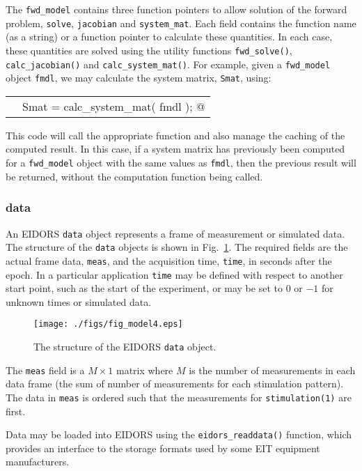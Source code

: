 \documentclass[12pt]{iopart}
\makeatletter
\newcommand{\CODEstart}{\medskip\begin{tabular}{ll}}
\newcommand{\CN}{\tt\scriptsize} %
\newcommand{\CC}{&\small\verb@}   % start code
\newcommand{\CODEend}{\end{tabular}\medskip}
\makeatother
\begin{document}
The {\tt fwd\_model} contains three function pointers
to allow solution of the forward problem,
{\tt solve},
{\tt jacobian} and
{\tt system\_mat}. Each field contains the function
name (as a string) or a function pointer to calculate
these quantities. In each case, these quantities
are solved using the utility functions 
{\tt fwd\_solve()}, 
{\tt calc\_jacobian()} and
{\tt calc\_system\_mat()}.
For example, given
a {\tt fwd\_model} object {\tt fmdl}, we may calculate
the system matrix, {\tt Smat}, using:

\CODEstart
\CN    \CC Smat = calc_system_mat( fmdl ); @\\[-3pt]
\CODEend

This code will
call the appropriate function and also manage
the caching of the computed result. In this case, if a
system matrix has previously been computed for
a {\tt fwd\_model} object with the same values
as {\tt fmdl}, then the previous result will be
returned, without the computation function being
called.


\subsubsection{data}

An EIDORS {\tt data} object represents a frame of
measurement or simulated data. The structure of the
{\tt data} objects is shown in Fig.~\ref{fig:data}. The
required fields are the actual frame data, {\tt meas},
and the acquisition time, {\tt time}, in seconds 
after the epoch. In a particular application {\tt time}
may be defined with respect to another start point, such as
the start of the experiment, or may be set to $0$ or $-1$ 
for unknown times or simulated data.

%
%
\begin{figure}[th]
\begin{flushright}
\texttt{[image: ./figs/fig\_model4.eps]}
\caption{\small The structure of the EIDORS {\tt data} object.
\label{fig:data}
 }
\end{flushright}
\end{figure}


The {\tt meas} field is a $M\times1$ matrix where
$M$ is the number of measurements in each data frame
(the sum of number of measurements for each stimulation
pattern). The data in {\tt meas} is ordered such that
the measurements for {\tt stimulation(1)} are first.

Data may be loaded into EIDORS using the {\tt eidors\_readdata()}
function, which provides an interface to the storage
formats used by some EIT equipment manufacturers.
\end{document}
